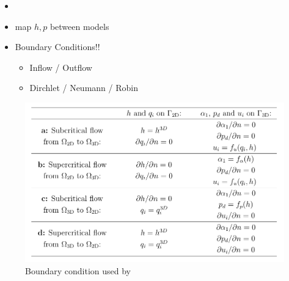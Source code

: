 \begin{frame}
\begin{multicols}{2}
\begin{itemize}
\item<2->[] \\[2cm]
\item<3->[] \hspace{0.23\columnwidth} map $h, p$ between models\\[1cm]
\item<4->[] {\Large\hspace{0.23\columnwidth}Boundary Conditions!!}
\begin{itemize}
 \setlength{\itemindent}{3.5cm}
\vspace{0.2cm}
\item<5-> Inflow / Outflow 
\item<5-> Dirchlet / Neumann / Robin
\end{itemize}
\end{itemize}
\end{multicols}
\end{frame}

\begin{frame}
\begin{figure}
\includegraphics[scale=0.44]{./Resources/Images/bcs_mintgen.png}
\caption{Boundary condition used by \cite{mintgen}}
\end{figure}
\end{frame}

